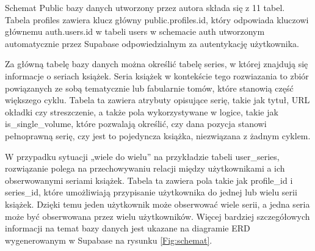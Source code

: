\documentclass[12pt,twoside]{article}
\begin{document}
Schemat Public bazy danych utworzony przez autora składa się z 11 tabel. Tabela profiles zawiera klucz główny 
public.profiles.id, który odpowiada kluczowi głównemu auth.users.id w tabeli users w schemacie auth utworzonym 
automatycznie przez Supabase odpowiedzialnym za autentykację użytkownika.

Za główną tabelę bazy danych można określić tabelę series, w której znajdują się informacje o seriach książek.
Seria książek w kontekście tego rozwiazania to zbiór powiązanych ze sobą tematycznie lub fabularnie tomów, które
stanowią część większego cyklu. Tabela ta zawiera atrybuty opisujące serię, takie jak tytuł, URL okładki czy 
streszczenie, a także pola wykorzystywane w logice, takie jak is\_single\_volume, które pozwalają określić, czy dana 
pozycja stanowi pełnoprawną serię, czy jest to pojedyncza książka, niezwiązana z żadnym cyklem.

W przypadku sytuacji „wiele do wielu” na przykładzie tabeli user\_series, rozwiązanie polega na przechowywaniu relacji 
między użytkownikami a ich obserwowanymi seriami książek. Tabela ta zawiera pola takie jak profile\_id i series\_id, 
które umożliwiają przypisanie użytkownika do jednej lub wielu serii książek. Dzięki temu jeden użytkownik może obserwować
wiele serii, a jedna seria może być obserwowana przez wielu użytkowników. Więcej bardziej szczegółowych informacji
na temat bazy danych jest ukazane na diagramie ERD wygenerowanym w Supabase na rysunku \ref{Fig:schemat}.
\end{document}
